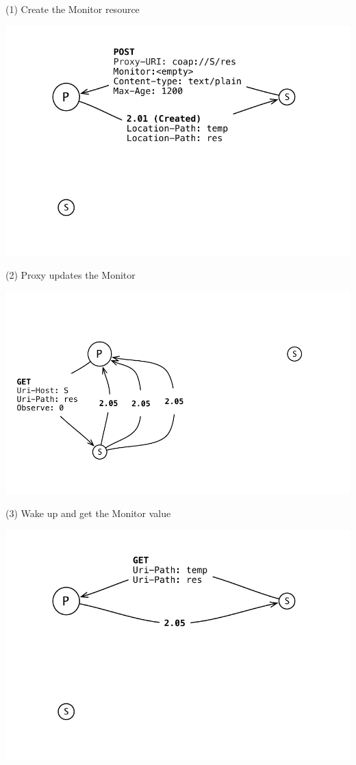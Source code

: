 \documentclass{beamer}
\begin{document}
\begin{frame}{(1) Create the Monitor resource}
 \begin{center}
  \includegraphics[width=\textwidth]{../../share/images/monitor1.pdf}
 \end{center}
\end{frame}

\begin{frame}{(2) Proxy updates the Monitor}
 \begin{center}
  \includegraphics[width=\textwidth]{../../share/images/monitor2.pdf}
 \end{center}
\end{frame}

\begin{frame}{(3) Wake up and get the Monitor value}
 \begin{center}
  \includegraphics[width=\textwidth]{../../share/images/monitor3.pdf}
 \end{center}
\end{frame}
\end{document}
